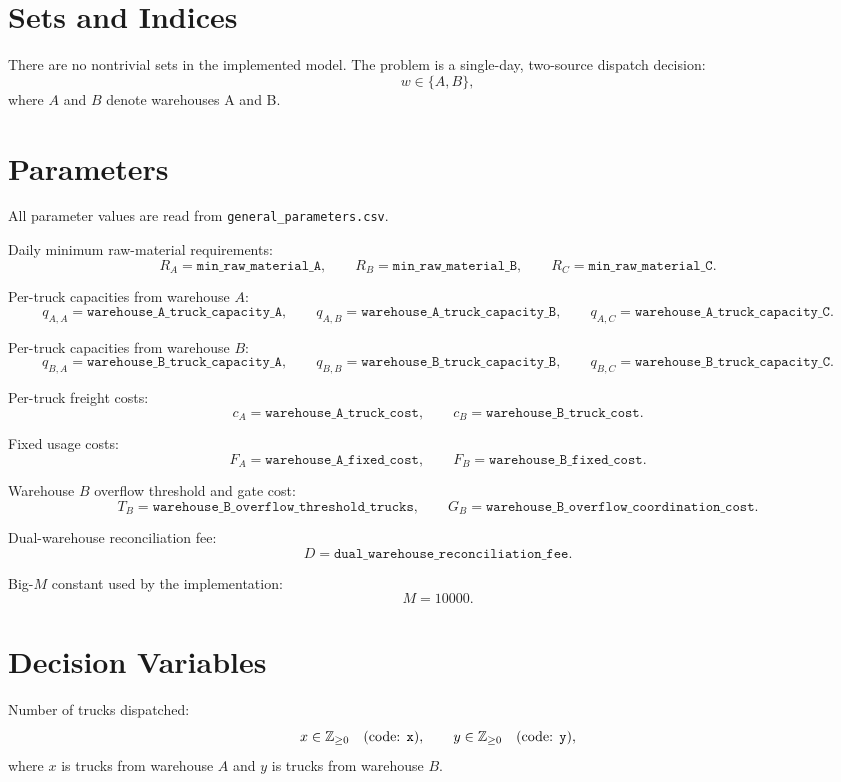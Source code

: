 \section*{Sets and Indices}

There are no nontrivial sets in the implemented model. The problem is a single-day, two-source dispatch decision:
\[
w \in \{A,B\},
\]
where \(A\) and \(B\) denote warehouses A and B.

\section*{Parameters}

All parameter values are read from \texttt{general\_parameters.csv}.

Daily minimum raw-material requirements:
\[
R_A = \texttt{min\_raw\_material\_A},\qquad
R_B = \texttt{min\_raw\_material\_B},\qquad
R_C = \texttt{min\_raw\_material\_C}.
\]

Per-truck capacities from warehouse \(A\):
\[
q_{A,A} = \texttt{warehouse\_A\_truck\_capacity\_A},\qquad
q_{A,B} = \texttt{warehouse\_A\_truck\_capacity\_B},\qquad
q_{A,C} = \texttt{warehouse\_A\_truck\_capacity\_C}.
\]

Per-truck capacities from warehouse \(B\):
\[
q_{B,A} = \texttt{warehouse\_B\_truck\_capacity\_A},\qquad
q_{B,B} = \texttt{warehouse\_B\_truck\_capacity\_B},\qquad
q_{B,C} = \texttt{warehouse\_B\_truck\_capacity\_C}.
\]

Per-truck freight costs:
\[
c_A = \texttt{warehouse\_A\_truck\_cost},\qquad
c_B = \texttt{warehouse\_B\_truck\_cost}.
\]

Fixed usage costs:
\[
F_A = \texttt{warehouse\_A\_fixed\_cost},\qquad
F_B = \texttt{warehouse\_B\_fixed\_cost}.
\]

Warehouse \(B\) overflow threshold and gate cost:
\[
T_B = \texttt{warehouse\_B\_overflow\_threshold\_trucks},\qquad
G_B = \texttt{warehouse\_B\_overflow\_coordination\_cost}.
\]

Dual-warehouse reconciliation fee:
\[
D = \texttt{dual\_warehouse\_reconciliation\_fee}.
\]

Big-\(M\) constant used by the implementation:
\[
M = 10000.
\]

\section*{Decision Variables}

Number of trucks dispatched:
\[
x \in \mathbb{Z}_{\ge 0} \quad \text{(code: \texttt{x})},
\qquad
y \in \mathbb{Z}_{\ge 0} \quad \text{(code: \texttt{y})},
\]
where \(x\) is trucks from warehouse \(A\) and \(y\) is trucks from warehouse \(B\).


